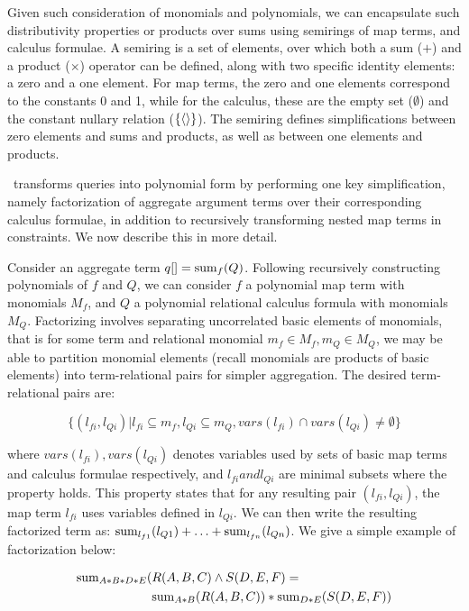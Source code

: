 Given such consideration of monomials and polynomials, we can encapsulate such
distributivity properties or products over sums using semirings of map terms,
and calculus formulae. A semiring is a set of elements, over which both a sum
($+$) and a product ($\times$) operator can be defined, along with two specific
identity elements: a zero and a one element. For map terms, the zero and one
elements correspond to the constants 0 and 1, while for the calculus, these are
the empty set ($\emptyset$) and the constant nullary relation
($\{{\langle\rangle}\}$). The semiring defines simplifications between zero elements and
sums and products, as well as between one elements and products.

\compiler\ transforms queries into polynomial form by performing one key
simplification, namely factorization of aggregate argument terms over their
corresponding calculus formulae, in addition to recursively transforming
nested map terms in constraints. We now describe this in more detail.

Consider an aggregate term $q[] = \mathrm{sum}_{f}(Q)$. Following recursively
constructing polynomials of $f$ and $Q$, we can consider $f$ a polynomial map
term with monomials $M_f$, and $Q$ a polynomial relational calculus formula
with monomials $M_Q$. Factorizing involves separating uncorrelated basic
elements of monomials, that is for some term and relational monomial $m_f
\in M_f, m_Q \in M_Q$, we may be able to partition monomial elements (recall
monomials are products of basic elements) into term-relational pairs for simpler
aggregation. The desired term-relational pairs are:

\[\{(l_{fi},l_{Qi}) | l_{fi} \subseteq m_f, l_{Qi} \subseteq m_Q,
vars(l_{fi}) \cap vars(l_{Qi}) \neq \emptyset\}\]

\noindent where $vars(l_{fi}), vars(l_{Qi})$ denotes variables used by sets of basic
map terms and calculus formulae respectively, and $l_{fi} and l_{Qi}$ are minimal
subsets where the property holds. This property states that for any resulting
pair $(l_{fi}, l_{Qi})$, the map term $l_{fi}$ uses variables defined in $l_{Qi}$. We can
then write the resulting factorized term as:
$\mathrm{sum}_{l_{f1}}(l_{Q1}) + \ldots + \mathrm{sum}_{l_{fn}}(l_{Qn})$.
We give a simple example of factorization below:

\begin{align*}
\mathrm{sum}_{A*B*D*E}( & R(A,B,C) \wedge S(D,E,F) =\\
& \mathrm{sum}_{A*B}(R(A,B,C)) * \mathrm{sum}_{D*E}(S(D,E,F))
\end{align*}

